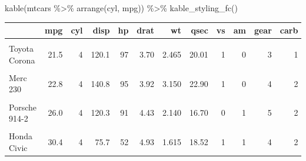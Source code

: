 \documentclass[
]{book}
\newenvironment{Shaded}{\begin{snugshade}}{\end{snugshade}}
\newcommand{\FunctionTok}[1]{\textcolor[rgb]{0.00,0.00,0.00}{#1}}
\newcommand{\NormalTok}[1]{#1}
\newcommand{\SpecialCharTok}[1]{\textcolor[rgb]{0.00,0.00,0.00}{#1}}
\begin{document}
\begin{Shaded}
\begin{Highlighting}[]
\FunctionTok{kable}\NormalTok{(mtcars }\SpecialCharTok{\%\textgreater{}\%} \FunctionTok{arrange}\NormalTok{(cyl, mpg)) }\SpecialCharTok{\%\textgreater{}\%} \FunctionTok{kable\_styling\_fc}\NormalTok{()}
\end{Highlighting}
\end{Shaded}

\begin{table}[!h]
\centering
\begin{tabular}{l|r|r|r|r|r|r|r|r|r|r|r}
\hline
  & mpg & cyl & disp & hp & drat & wt & qsec & vs & am & gear & carb\\
\hline
\cellcolor{gray!6}{Volvo 142E} & \cellcolor{gray!6}{21.4} & \cellcolor{gray!6}{4} & \cellcolor{gray!6}{121.0} & \cellcolor{gray!6}{109} & \cellcolor{gray!6}{4.11} & \cellcolor{gray!6}{2.780} & \cellcolor{gray!6}{18.60} & \cellcolor{gray!6}{1} & \cellcolor{gray!6}{1} & \cellcolor{gray!6}{4} & \cellcolor{gray!6}{2}\\
\hline
Toyota Corona & 21.5 & 4 & 120.1 & 97 & 3.70 & 2.465 & 20.01 & 1 & 0 & 3 & 1\\
\hline
\cellcolor{gray!6}{Datsun 710} & \cellcolor{gray!6}{22.8} & \cellcolor{gray!6}{4} & \cellcolor{gray!6}{108.0} & \cellcolor{gray!6}{93} & \cellcolor{gray!6}{3.85} & \cellcolor{gray!6}{2.320} & \cellcolor{gray!6}{18.61} & \cellcolor{gray!6}{1} & \cellcolor{gray!6}{1} & \cellcolor{gray!6}{4} & \cellcolor{gray!6}{1}\\
\hline
Merc 230 & 22.8 & 4 & 140.8 & 95 & 3.92 & 3.150 & 22.90 & 1 & 0 & 4 & 2\\
\hline
\cellcolor{gray!6}{Merc 240D} & \cellcolor{gray!6}{24.4} & \cellcolor{gray!6}{4} & \cellcolor{gray!6}{146.7} & \cellcolor{gray!6}{62} & \cellcolor{gray!6}{3.69} & \cellcolor{gray!6}{3.190} & \cellcolor{gray!6}{20.00} & \cellcolor{gray!6}{1} & \cellcolor{gray!6}{0} & \cellcolor{gray!6}{4} & \cellcolor{gray!6}{2}\\
\hline
Porsche 914-2 & 26.0 & 4 & 120.3 & 91 & 4.43 & 2.140 & 16.70 & 0 & 1 & 5 & 2\\
\hline
\cellcolor{gray!6}{Fiat X1-9} & \cellcolor{gray!6}{27.3} & \cellcolor{gray!6}{4} & \cellcolor{gray!6}{79.0} & \cellcolor{gray!6}{66} & \cellcolor{gray!6}{4.08} & \cellcolor{gray!6}{1.935} & \cellcolor{gray!6}{18.90} & \cellcolor{gray!6}{1} & \cellcolor{gray!6}{1} & \cellcolor{gray!6}{4} & \cellcolor{gray!6}{1}\\
\hline
Honda Civic & 30.4 & 4 & 75.7 & 52 & 4.93 & 1.615 & 18.52 & 1 & 1 & 4 & 2\\

\end{tabular}
\end{table}
\end{document}
